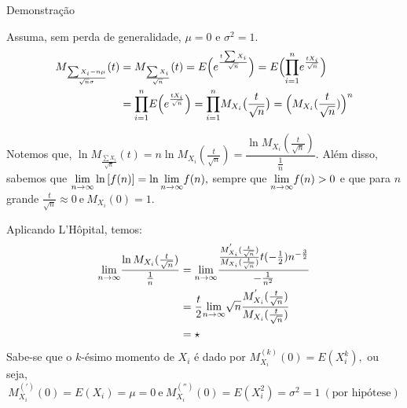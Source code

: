 \documentclass[12pt]{beamer}
\begin{document}
\begin{frame}{Demonstração}
\begin{block}{}
\justifying
Assuma, sem perda de generalidade, $\mu=0$ e $\sigma^{2}=1.$
\begin{align*}
    M_{\frac{\sum X_{i}-n\mu}{\sqrt{n}\sigma}}(t)&=M_{\frac{\sum X_{i}}{\sqrt{n}}}(t)
    =E\Big(e^{\frac{t\sum X_{i}}{\sqrt{n}}}\Big)=E\Big({\displaystyle \prod_{i=1}^{n}} e^{\frac{tX_{i}}{\sqrt{n}}}\Big)\\
    &={\displaystyle \prod_{i=1}^{n}} E\Big(e^{\frac{tX_{i}}{\sqrt{n}}}\Big)={\displaystyle \prod_{i=1}^{n}} M_{X_{i}}\big(\frac{t}{\sqrt{n}}\big)=\Big(M_{X_{i}}(\dfrac{t}{\sqrt{n}})\Big)^{n}
\end{align*}
\end{block}
\pause
\begin{block}{}
Notemos que, $\ln{M_{\frac{\sum X_{i}}{\sqrt{n}}}(t)}=n\ln{M_{X_{i}}(\frac{t}{\sqrt{n}})}=\dfrac{\ln{M_{X_{i}}(\frac{t}{\sqrt{n}})}}{\frac{1}{n}}.$ Além disso, sabemos que ${\displaystyle \lim_{n\to\infty}} \ln{[f(n)]}=\ln{{\displaystyle \lim_{n\to\infty}}f(n)},$ sempre que ${\displaystyle \lim_{n\to\infty}} f(n)>0$ e que para $n$ grande $\frac{t}{\sqrt{n}}\approx 0~\text{e}~M_{X_{i}}(0)=1.$
\end{block}
\end{frame}

\begin{frame}{}
\begin{block}{}
\justifying
Aplicando L'Hôpital, temos:
\begin{align*}
    {\displaystyle \lim_{n\to\infty}} \frac{\ln{M_{X_{i}}(\frac{t}{\sqrt{n}})}}{\frac{1}{n}}&={\displaystyle \lim_{n\to\infty}} \dfrac{\frac{M_{X_{i}}^{'}(\frac{t}{\sqrt{n}})}{M_{X_{i}}(\frac{t}{\sqrt{n}})}t(-\frac{1}{2})n^{-\frac{3}{2}}}{-\frac{1}{n^{2}}}\\
    &=\dfrac{t}{2}{\displaystyle \lim_{n\to\infty}} \sqrt{n}\dfrac{M_{X_{i}}^{'}(\frac{t}{\sqrt{n}})}{M_{X_{i}}(\frac{t}{\sqrt{n}})}\\
    &=\star
\end{align*}
Sabe-se que o $k$-ésimo momento de $X_{i}$ é dado por $M_{X_{i}}^{(k)}(0)=E(X_{i}^{k}),$ ou seja,
$$M_{X_{i}}^{(')}(0)=E(X_{i})=\mu=0~\text{e}~M_{X_{i}}^{('')}(0)=E(X_{i}^{2})=\sigma^{2}=1~(\text{por hipótese}) $$
%
\end{block}
\end{frame}
\end{document}
